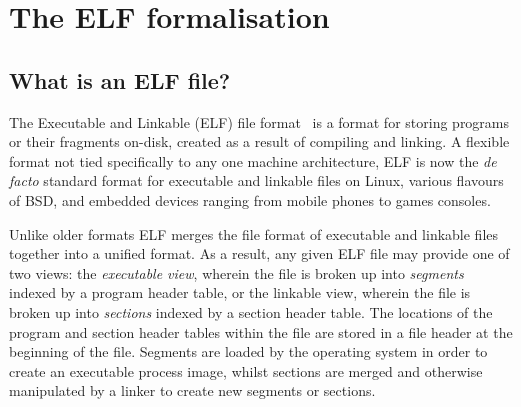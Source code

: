 \section{The ELF formalisation}
\label{sect.elf.formalisation}

\subsection{What is an ELF file?}
\label{subsect.what.is.an.elf.file}


The Executable and Linkable (ELF) file format~\cite{elf-sco-model} is a format for storing programs or their fragments on-disk, created as a result of compiling and linking.
A flexible format not tied specifically to any one machine architecture, ELF is now the \emph{de facto} standard format for executable and linkable files on Linux, various flavours of BSD, and embedded devices ranging from mobile phones to games consoles.

Unlike older formats ELF merges the file format of executable and linkable files together into a unified format.
As a result, any given ELF file may provide one of two views: the \emph{executable view}, wherein the file is broken up into \emph{segments} indexed by a program header table, or the linkable view, wherein the file is broken up into \emph{sections} indexed by a section header table.
The locations of the program and section header tables within the file are stored in a file header at the beginning of the file.
Segments are loaded by the operating system in order to create an executable process image, whilst sections are merged and otherwise manipulated by a linker to create new segments or sections.

